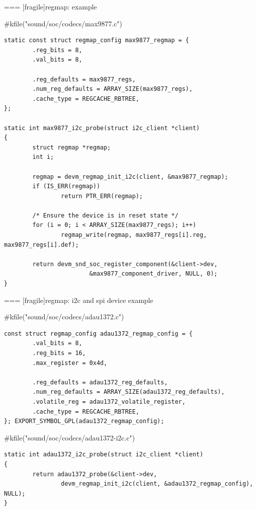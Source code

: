 === [fragile]{regmap: example}
  \begin{block}{#kfile("sound/soc/codecs/max9877.c")}
  \fontsize{8}{8}\selectfont
    \begin{verbatim}
static const struct regmap_config max9877_regmap = {
        .reg_bits = 8,
        .val_bits = 8,

        .reg_defaults = max9877_regs,
        .num_reg_defaults = ARRAY_SIZE(max9877_regs),
        .cache_type = REGCACHE_RBTREE,
};

static int max9877_i2c_probe(struct i2c_client *client)
{
        struct regmap *regmap;
        int i;

        regmap = devm_regmap_init_i2c(client, &max9877_regmap);
        if (IS_ERR(regmap))
                return PTR_ERR(regmap);

        /* Ensure the device is in reset state */
        for (i = 0; i < ARRAY_SIZE(max9877_regs); i++)
                regmap_write(regmap, max9877_regs[i].reg, max9877_regs[i].def);

        return devm_snd_soc_register_component(&client->dev,
                        &max9877_component_driver, NULL, 0);
}
    \end{verbatim}
  \end{block}


=== [fragile]{regmap: i2c and spi device example}
  \begin{block}{#kfile("sound/soc/codecs/adau1372.c")}
  \fontsize{8}{8}\selectfont
    \begin{verbatim}
const struct regmap_config adau1372_regmap_config = {
        .val_bits = 8,
        .reg_bits = 16,
        .max_register = 0x4d,

        .reg_defaults = adau1372_reg_defaults,
        .num_reg_defaults = ARRAY_SIZE(adau1372_reg_defaults),
        .volatile_reg = adau1372_volatile_register,
        .cache_type = REGCACHE_RBTREE,
}; EXPORT_SYMBOL_GPL(adau1372_regmap_config);
    \end{verbatim}
  \end{block}
  \begin{block}{#kfile("sound/soc/codecs/adau1372-i2c.c")}
  \fontsize{8}{8}\selectfont
    \begin{verbatim}
static int adau1372_i2c_probe(struct i2c_client *client)
{
        return adau1372_probe(&client->dev,
                devm_regmap_init_i2c(client, &adau1372_regmap_config), NULL);
}
    \end{verbatim}
  \end{block}


